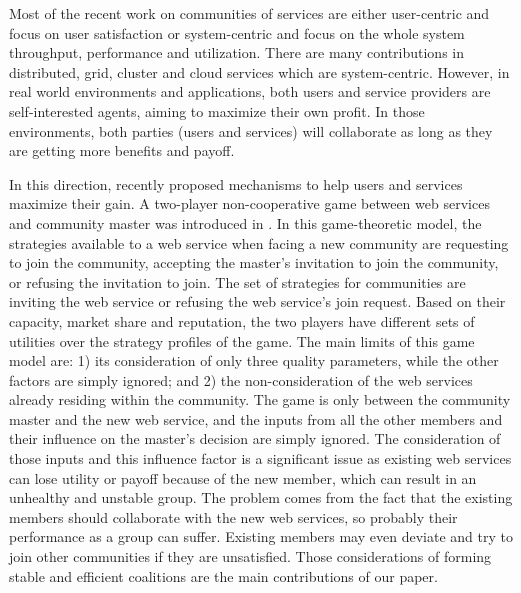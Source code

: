 \documentclass[11pt,onecolumn]{IEEEtran}
\begin{document}
{Most of the recent work on communities of services are either
user-centric and focus on user satisfaction
\cite{Chun02user-centricperformance} or system-centric and focus
on the whole system throughput, performance and utilization. There
are many contributions in distributed, grid, cluster and cloud
services which are system-centric. However, in real world
environments and applications, both users and service providers
are self-interested agents, aiming to maximize their own profit.
In those environments, both parties (users and services) will
collaborate as long as they are getting more benefits and payoff.

In this direction, recently \cite{DBLP:conf/IEEEscc/LimTMB12,
DBLP:conf/IEEEscc/KhosravifarABT11, 10.1109/TSC.2012.12} proposed
mechanisms to help users and services maximize their gain. A
two-player non-cooperative game between web services and community
master was introduced in
\cite{DBLP:conf/IEEEscc/KhosravifarABT11}. In this game-theoretic
model, the strategies available to a web service when facing a new
community are requesting to join the community, accepting the
master's invitation to join the community, or refusing the
invitation to join. The set of strategies for communities are
inviting the web service or refusing the web service's join
request. Based on their capacity, market share and reputation, the
two players have different sets of utilities over the strategy
profiles of the game. The main limits of this game model are: 1)
its consideration of only three quality parameters, while the
other factors are simply ignored; and 2) the non-consideration of
the web services already residing within the community. The game
is only between the community master and the new web service, and
the inputs from all the other members and their influence on the
master's decision are simply ignored. The consideration of those
inputs and this influence factor is a significant issue as
existing web services can lose utility or payoff because of the
new member, which can result in an unhealthy and unstable group.
The problem comes from the fact that the existing members should
collaborate with the new web services, so probably their
performance as a group can suffer. Existing members may even
deviate and try to join other communities if they are unsatisfied.
Those considerations of forming stable and efficient coalitions
are the main contributions of our paper.

}
\end{document}
